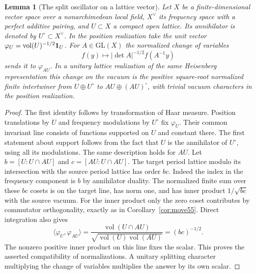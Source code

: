 \documentclass[a4paper,11pt]{article}
\newtheorem{lemma}[proposition]{Lemma}
\theoremstyle{definition}
\theoremstyle{remark}
\numberwithin{equation}{section}
\begin{document}
\begin{lemma}[The split oscillator on a lattice vector]\label{lem:split61}
Let \(X\) be a finite-dimensional vector space over a nonarchimedean
local field, \(X^\vee\) its frequency space with a perfect additive
pairing, and \(U\subset X\) a compact open lattice. Its annihilator
is denoted by \(U^\circ\subset X^\vee\). In the position
realization take the unit vector
\(\varphi_U=\operatorname{vol}(U)^{-1/2}{\bf1}_U\).
For \(A\in\mathrm{GL}(X)\) the normalized change of variables
\[
       f(y)\longmapsto|\det A|^{-1/2}f(A^{-1}y)
\]
sends it to \(\varphi_{AU}\). In a unitary lattice realization of
the same Heisenberg representation this change on the vacuum is
the positive square-root normalized finite intertwiner from
\(U\oplus U^\circ\) to \(AU\oplus(AU)^\circ\), with trivial
vacuum characters in the position realization.
\end{lemma}
\begin{proof}
The first identity follows by transformation of Haar measure.
Position translations by \(U\) and frequency modulations by
\(U^\circ\) fix \(\varphi_U\). Their common invariant line consists
of functions supported on \(U\) and constant there. The first
statement about support follows from the fact that \(U\) is the
annihilator of \(U^\circ\), using all its modulations. The same
description holds for \(AU\). Let
\(b=[U:U\cap AU]\) and \(c=[AU:U\cap AU]\).
The target period lattice modulo its intersection with the
source period lattice has order \(bc\). Indeed the index in
the frequency component is \(b\) by annihilator duality.
The normalized finite sum over these \(bc\) cosets is on the
target line, has norm one, and has inner product \(1/\sqrt{bc}\)
with the source vacuum. For the inner product only the zero coset
contributes by commutator orthogonality, exactly as in
Corollary~\ref{cor:move55}. Direct integration also gives
\[
       \langle\varphi_U,\varphi_{AU}\rangle
        =\frac{\operatorname{vol}(U\cap AU)}
                {\sqrt{\operatorname{vol}(U)\operatorname{vol}(AU)}}
        =(bc)^{-1/2}.
\]
The nonzero positive inner product on this line fixes the scalar.
This proves the asserted compatibility of normalizations. A unitary
splitting character multiplying the change of variables multiplies
the answer by its own scalar.
\end{proof}
\end{document}
